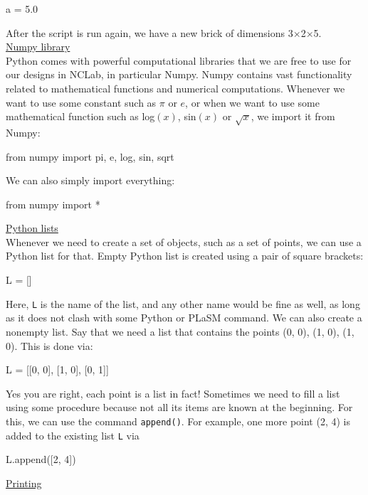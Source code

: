 \begin{bluecode}
a = 5.0
\end{bluecode} 
After the script is run again, we have a new brick of dimensions 3$\times$2$\times$5.\\

\noindent
\underline{Numpy library}\\

\noindent
Python comes with powerful computational libraries that we are free to use 
for our designs in NCLab, 
in particular Numpy. Numpy contains vast functionality related to 
mathematical functions and numerical computations. Whenever we want 
to use some constant such as $\pi$ or $e$, or when we want to use some 
mathematical function such as log$(x)$, sin$(x)$ or $\sqrt{x}$, we
import it from Numpy:

\begin{bluecode}
from numpy import pi, e, log, sin, sqrt
\end{bluecode} 
We can also simply import everything:

\begin{bluecode}
from numpy import *
\end{bluecode} 
\vspace{4mm}
\underline{Python lists}\\

\noindent
Whenever we need to create a set of objects, such as a set of points, we can use 
a Python list for that. Empty Python list is created using a pair of square brackets:

\begin{bluecode}
L = []
\end{bluecode} 
Here, {\tt L} is the name of the list, and any other name would be fine as well, 
as long as it does not clash with some Python or PLaSM command. We can also create 
a nonempty list. Say that we need a list that contains the points (0, 0), (1, 0),
(1, 0). This is done via:

\begin{bluecode}
L = [[0, 0], [1, 0], [0, 1]]
\end{bluecode} 
Yes you are right, each point is a list in fact! Sometimes we need to fill 
a list using some procedure because not all its items are known at the
beginning. For this, we can use the command {\tt append()}. For example,
one more point (2, 4) is added to the existing list {\tt L} via

\begin{bluecode}
L.append([2, 4])
\end{bluecode} 
\vspace{4mm}
\underline{Printing}\\

